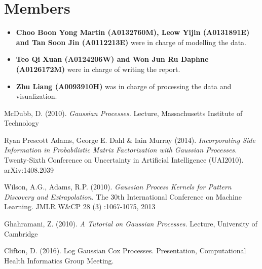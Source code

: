 \documentclass[a4paper, 10pt, conference]{ieeeconf}
\begin{document}
	\section{Members}
	\begin{itemize}
		\item {\bf Choo Boon Yong Martin (A0132760M), Leow Yijin (A0131891E) and Tan Soon Jin (A0112213E)} were in charge of modelling the data.
		\item {\bf Teo Qi Xuan (A0124206W) and Won Jun Ru Daphne (A0126172M)} were in charge of writing the report.
		\item {\bf Zhu Liang (A0093910H)} was in charge of processing the data and visualization.
	\end{itemize}

	\begin{thebibliography}{9}
	McDubb, D. (2010).
	\textit{Gaussian Processes.}
	Lecture, Massachusetts Institute of Technology
	
	Ryan Prescott Adams, George E. Dahl \& Iain Murray (2014).
	\textit{Incorporating Side Information in Probabilistic Matrix Factorization with Gaussian Processes.}
	Twenty-Sixth Conference on Uncertainty in Artificial Intelligence (UAI2010). arXiv:1408.2039

	Wilson, A.G., Adams, R.P. (2010).
	\textit{Gaussian Process Kernels for Pattern Discovery and Extrapolation.}
	The 30th International Conference on Machine Learning. JMLR W\&CP 28 (3) :1067-1075, 2013
	
	Ghahramani, Z. (2010).
	\textit{A Tutorial on Gaussian Processes.}
	Lecture, University of Cambridge
	
	Clifton, D. (2016).
	Log Gaussian Cox Processes. Presentation, Computational Health Informatics Group Meeting.

	
	
	\end{thebibliography}
\end{document}
